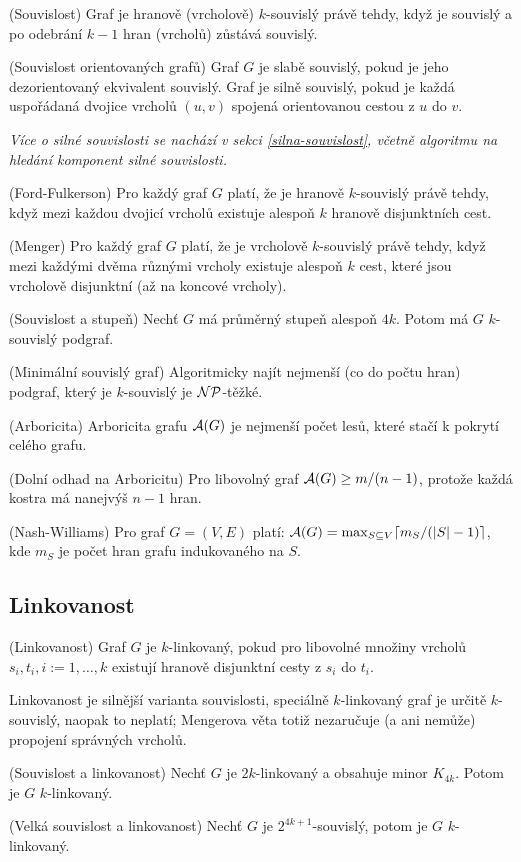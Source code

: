\df (Souvislost) Graf je hranově (vrcholově) $k$-souvislý právě tehdy, když je 
souvislý a po odebrání $k-1$ hran (vrcholů) zůstává souvislý.

\df (Souvislost orientovaných grafů) Graf $G$ je slabě souvislý, pokud je jeho 
dezorientovaný ekvivalent souvislý. Graf je silně souvislý, pokud je každá uspořádaná dvojice vrcholů $(u,v)$ spojená orientovanou cestou z $u$ do $v$.

{\it Více o silné souvislosti se nachází v sekci \ref{silna-souvislost}, včetně 
algoritmu na hledání komponent silné souvislosti.}

\vt (Ford-Fulkerson) Pro každý graf $G$ platí, že je hranově $k$-souvislý právě 
tehdy, když mezi každou dvojicí vrcholů existuje alespoň $k$ hranově 
disjunktních cest.

\vt (Menger) Pro každý graf $G$ platí, že je vrcholově $k$-souvislý právě 
tehdy, když mezi každými dvěma různými vrcholy existuje alespoň $k$ cest, které 
jsou vrcholově disjunktní (až na koncové vrcholy).

\vt (Souvislost a stupeň) Nechť $G$ má průměrný stupeň alespoň $4k$. Potom má 
$G$ $k$-souvislý podgraf.

\vt (Minimální souvislý graf) Algoritmicky najít nejmenší (co do počtu hran) 
podgraf, který je $k$-souvislý je $\mathcal{NP}$-těžké.

\df (Arboricita) Arboricita grafu $\mathcal{A}(G)$ je nejmenší počet lesů, které stačí k 
pokrytí celého grafu.

\poz (Dolní odhad na Arboricitu) Pro libovolný graf $\mathcal{A}(G) \geq m/(n-1)$, 
protože každá kostra má nanejvýš $n-1$ hran.

\vt (Nash-Williams) Pro graf $G=(V,E)$ platí: $\mathcal{A}(G) = \max_{S \subseteq V} 
\lceil m_S / (|S| -1 ) \rceil$, kde $m_S$ je počet hran grafu indukovaného na 
$S$.

\subsection{Linkovanost}

\df (Linkovanost) Graf $G$ je $k$-linkovaný, pokud pro libovolné množiny 
vrcholů $s_i, t_i, i := 1,\dots, k$ existují hranově disjunktní cesty z $s_i$ 
do $t_i$.

\pzn Linkovanost je silnější varianta souvislosti, speciálně $k$-linkovaný graf 
je určitě $k$-souvislý, naopak to neplatí; Mengerova věta totiž nezaručuje (a 
ani nemůže) propojení správných vrcholů.

\vt (Souvislost a linkovanost) Nechť $G$ je $2k$-linkovaný a obsahuje minor 
$K_{4k}$. Potom je $G$ $k$-linkovaný.

\vt (Velká souvislost a linkovanost) Nechť $G$ je $2^{4k+1}$-souvislý, potom je 
$G$ $k$-linkovaný.



